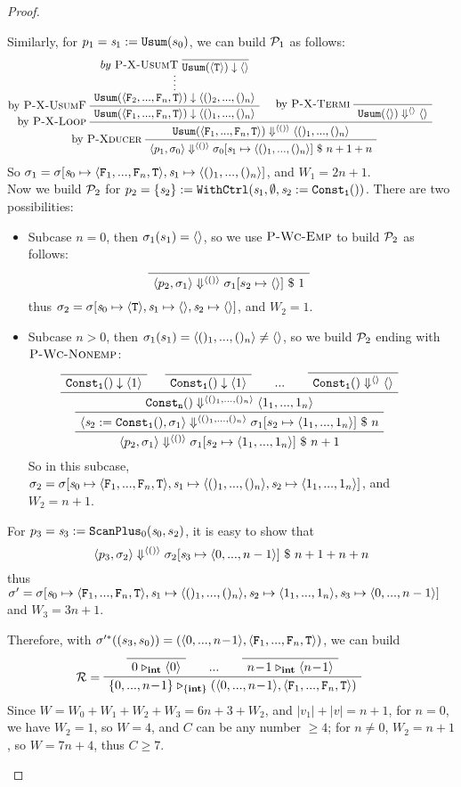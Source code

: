 \begin{proof}
\begin{itemize}
	 Similarly, for $p_1 = \sdef{\s_1}{\usum(s_0)}$, we can build $\MP_1$ as follows:
	 $$\PT{
	 	\AC{ \infer*{\blockf{\usum}{\<\F_2,...,\F_n,\T\'>}{\< ()_2,...,()_n\'>}} 
	 		{by \ \PName{X-UsumT} \  \vcenter{\infer {\blockf{\usum}{\singl{\T}}{\emptyv}}{}}}
	 	}
	 	\LeftLabel{by \PName{X-UsumF}}
	 	\UC{\blockf{\usum}{\flagn}{\nunit}}
	 	\AC{}
	 	\LeftLabel{by \PName{X-Termi}}
	 	\UC{\sevalfg{\usum}{\emptyv}{\emptyv} \emptyv}
	 	\LeftLabel{by \PName{X-Loop}}
	 	\BC{\sevalfg{\usum}{\flagn}{\vunit}{\nunit}}
	 	\LeftLabel{by \PName{Xducer}}
	 	\UC{\seval{p_1}{\sgm_0}{\vunit}{\sgm_0[\s_1 \|-> \nunit]}{n+1+n}}
	 }$$
	 So $\sgm_1 = \sgm[\s_0 \|-> \flagn, \s_1 \|-> \nunit]$, and $W_1 = 2n+1$. \\
	 
	 Now we build $\MP_2$ for $p_2 = \withctrl{\s_1}{\sdef{\s_2}{\consta{1}()}}{\emptyset}{\{\s_2\}}$. There are two possibilities: 
	 
	 \begin{itemize}
	 	\item Subcase $n=0$, then $\sgm_1(s_1) = \emptyv$, so we use $\PName{Wc-Emp}$ to build $\MP_2$ as follows:	 	
	 	$$\PT{\Axiom{\seval{p_2}{\sgm_1}{\vunit}{\sgm_1[s_2 \|-> \emptyv]}{1}}}$$
	 	thus $\sgm_2 = \sgm[\s_0 \|-> \oT, \s_1 \|-> \emptyv, \s_2 \|-> \emptyv]$, and $W_2 = 1$. 
	 	
		\item Subcase $n >0$, then $\sgm_1(s_1) = \nunit \neq \emptyv$, so we build $\MP_2$ ending with $\PName{Wc-Nonemp}$:
		$$\PT{
			\Axiom{\blockf{\consta{1}}{}{\singl{1}}}
			\Axiom{\blockf{\consta{1}}{}{\singl{1}}}
			\AC{...}
			\Axiom{\sevalfg{\consta{1}}{}{\emptyv}{\emptyv}}
			\QuaternaryInfC{$\sevalfg{\consta{n}}{}{\nunit}{\<1_1,...,1_n\'>}$}
			\UC{\seval{\sdef{\s_2}{\consta{1}()}}{\sgm_1}{\nunit}
				{\sgm_1[s_2 \|-> \<1_1,...,1_n\'>]}{n}}
			\UC{\seval{p_2}{\sgm_1}{\vunit}{\sgm_1[s_2 \|-> \<1_1,...,1_n\'>]}{n+1}}}$$
	 	So in this subcase, $\sgm_2 = \sgm[\s_0 \|-> \flagn, \s_1 \|-> \nunit, \s_2 \|-> \<1_1,...,1_n\'>]$, and $W_2 = n+1$.
	 \end{itemize}

	 For $p_3 = \sdef{\s_3}{\scan_{0}(\s_0,s_2)}$, it is easy to show that 
	 $$\seval{p_3}{\sgm_2}{\vunit}{\sgm_2[\s_3 \|-> \<0,...,n-1\'>]}{n+1+n+n}$$ 
	 thus $\sgm' = \sgm[\s_0 \|-> \flagn, \s_1 \|-> \nunit, \s_2 \|-> \<1_1,...,1_n\'>, \s_3 \|-> \<0,...,n-1\'>]$ 
	 and $W_3= 3n+1$. 
	 
	 Therefore, with $\sgm'^*((s_3,s_0)) = (\<0,...,n\!-\!1\'>,\flagn)$, we can build 
	 $$\PT{
	 	\Axiom{\ValRep{0}{\int}{\singl{0}}}
	 	\AC{...}
	 	\Axiom{\ValRep{n\!-\!1}{\int}{\singl{n\!-\!1}}}
	 	\LeLa{\MR =}
	 	\TC{\ValRep{\{0,...,n\!-\!1\}}{\tseq{\int}}{(\<0,...,n\!-\!1\'>,\flagn)}}
	 }$$
	 Since $W = W_0+W_1+W_2+W_3 = 6n+3 + W_2$, and $|v_1|+|v| = n+1$,
     for $n=0$, we have $W_2=1$, so $W = 4 $, and  $C$ can be any number $\ge 4$;
     for $n \neq 0$, $W_2 = n+1$, so $W= 7n+4$, thus $C \ge 7$.
	 	
	
\end{itemize}
\end{proof}



